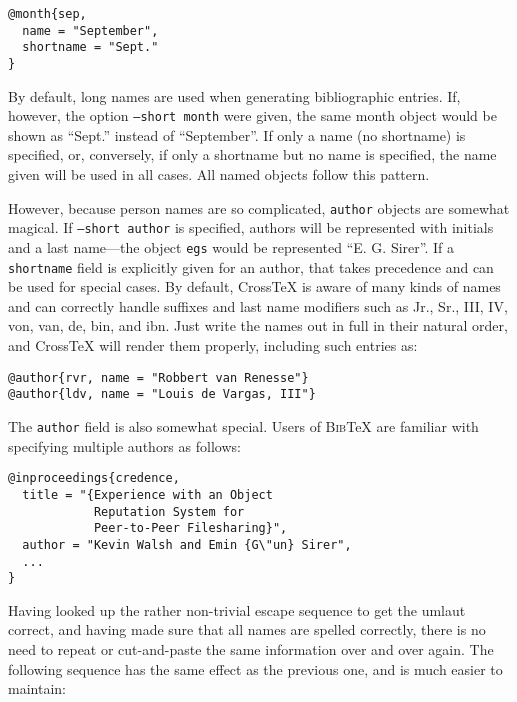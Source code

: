 \documentclass{article}
\newcommand{\XTeX}{Cross\TeX}
\newcommand{\BibTeX}{\textsc{Bib}\TeX}
\begin{document}
\begin{small}\begin{verbatim}
@month{sep,
  name = "September",
  shortname = "Sept."
}
\end{verbatim}\end{small}

By default, long names are used when generating bibliographic entries. If, however, the option \texttt{--short month} were given, the same month object would be shown as ``Sept.'' instead of ``September''. If only a name (no shortname) is specified, or, conversely, if only a shortname but no name is specified, the name given will be used in all cases. All named objects follow this pattern.

However, because person names are so complicated, \texttt{author} objects are somewhat magical. If \texttt{--short author} is specified, authors will be represented with initials and a last name---the object \texttt{egs} would be represented ``E. G. Sirer''. If a \texttt{shortname} field is explicitly given for an author, that takes precedence and can be used for special cases. 
By default, \XTeX{} is aware of many kinds of names and can correctly handle suffixes and last name modifiers such as Jr., Sr., III, IV, von, van, de, bin, and ibn. Just write the names out in full in their natural order, and \XTeX{} will render them properly, including such entries as:

\begin{small}\begin{verbatim}
@author{rvr, name = "Robbert van Renesse"}
@author{ldv, name = "Louis de Vargas, III"}
\end{verbatim}\end{small}

The \texttt{author} field is also somewhat special. Users of \BibTeX{} are familiar with specifying multiple authors as follows:

\begin{small}\begin{verbatim}
@inproceedings{credence,
  title = "{Experience with an Object
            Reputation System for 
            Peer-to-Peer Filesharing}",
  author = "Kevin Walsh and Emin {G\"un} Sirer",
  ...
}
\end{verbatim}\end{small}

Having looked up the rather non-trivial escape sequence to get the umlaut 
correct, and having made sure that all names are spelled correctly, there
is no need to repeat or cut-and-paste the same information over and over
again. The following sequence has the same effect as the previous one, 
and is much easier to maintain:
\end{document}
